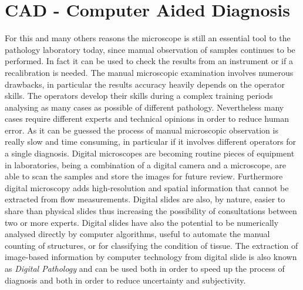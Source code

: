 \documentclass[final,a4paper,12pt,english]{UnicaPhdThesis3}
\begin{document}
	\section{CAD - Computer Aided Diagnosis} %
	For this and many others reasons the microscope is still an essential tool to the pathology laboratory today, since manual observation of samples continues to be performed. In fact it can be used to check the results from an instrument or if a recalibration is needed. The manual microscopic examination involves numerous drawbacks, in particular the results accuracy heavily depends on the operator skills. The operators develop their skills during a complex training periods analysing as many cases as possible of different pathology. Nevertheless many cases require different experts and technical opinions in order to reduce human error. As it can be guessed the process of manual microscopic observation is really slow and time consuming, in particular if it involves different operators for a single diagnosis. Digital microscopes are becoming routine pieces of equipment in laboratories, being a combination of a digital camera and a microscope, are able to scan the samples and store the images for future review. Furthermore digital microscopy adds high-resolution and spatial information that cannot be extracted from flow measurements. Digital slides are also, by nature, easier to share than physical slides thus increasing the possibility of consultations between two or more experts. Digital slides have also the potential to be numerically analysed directly by computer algorithms, useful to automate the manual counting of structures, or for classifying the condition of tissue. The extraction of image-based information by computer technology from digital slide is also known as \textit{Digital Pathology} and can be used both in order to speed up the process of diagnosis and both in order to reduce uncertainty and subjectivity.
	
\end{document}
